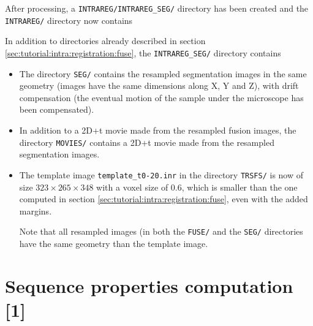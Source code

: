 After processing, a \texttt{INTRAREG/INTRAREG\_SEG/} directory has
been created and the \texttt{INTRAREG/} directory now contains

\mbox{}
\mbox{}

In addition to directories already described in section
\ref{sec:tutorial:intra:registration:fuse}, the \texttt{INTRAREG\_SEG/} directory contains
\begin{itemize}
\itemsep -1ex
\item The directory \texttt{SEG/} contains the resampled segmentation images
  in the same geometry (images have the same dimensions along X, Y and
  Z), with drift compensation (the eventual motion of the sample under the
  microscope has been compensated). 
\item In addition to a 2D+t movie made from the resampled fusion
  images, the directory \texttt{MOVIES/} contains a 2D+t movie made from the resampled segmentation
  images.
\item The template image \texttt{template\_t0-20.inr} in the directory
  \texttt{TRSFS/} 
  is now of size $323 \times 265 \times 348$ with a voxel size of 0.6,
  which is smaller than the one computed in section
  \ref{sec:tutorial:intra:registration:fuse}, even with the added
  margins.
  
  Note that all resampled images (in both the \texttt{FUSE/} and the
  \texttt{SEG/} directories have the same geometry than the template
  image. 
\end{itemize}


\section{Sequence properties computation [1]}
\label{sec:tutorial:properties:seg}

